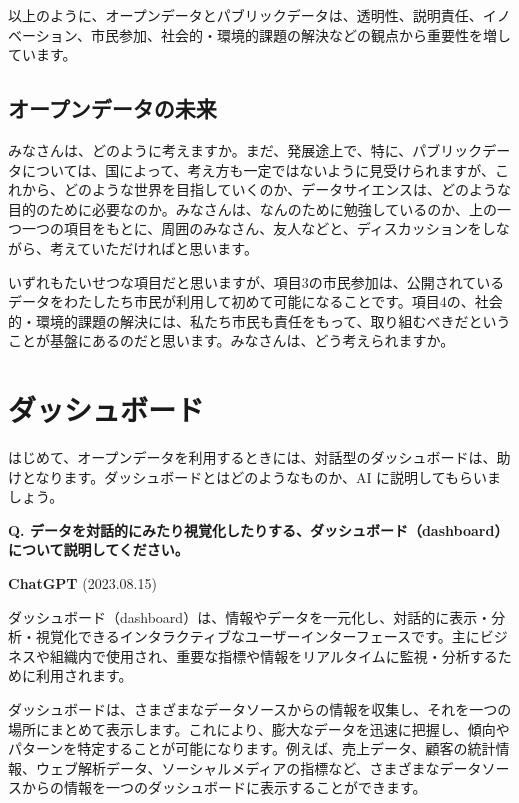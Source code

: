 \documentclass[
  xelatex, ja=standard]{bxjsbook}
\theoremstyle{definition}
\theoremstyle{definition}
\theoremstyle{definition}
\theoremstyle{definition}
\theoremstyle{remark}
\begin{document}
以上のように、オープンデータとパブリックデータは、透明性、説明責任、イノベーション、市民参加、社会的・環境的課題の解決などの観点から重要性を増しています。

\hypertarget{ux30aaux30fcux30d7ux30f3ux30c7ux30fcux30bfux306eux672aux6765}{%
\subsection{オープンデータの未来}\label{ux30aaux30fcux30d7ux30f3ux30c7ux30fcux30bfux306eux672aux6765}}

みなさんは、どのように考えますか。まだ、発展途上で、特に、パブリックデータについては、国によって、考え方も一定ではないように見受けられますが、これから、どのような世界を目指していくのか、データサイエンスは、どのような目的のために必要なのか。みなさんは、なんのために勉強しているのか、上の一つ一つの項目をもとに、周囲のみなさん、友人などと、ディスカッションをしながら、考えていただければと思います。

いずれもたいせつな項目だと思いますが、項目3の市民参加は、公開されているデータをわたしたち市民が利用して初めて可能になることです。項目4の、社会的・環境的課題の解決には、私たち市民も責任をもって、取り組むべきだということが基盤にあるのだと思います。みなさんは、どう考えられますか。

\hypertarget{ux30c0ux30c3ux30b7ux30e5ux30dcux30fcux30c9}{%
\section{ダッシュボード}\label{ux30c0ux30c3ux30b7ux30e5ux30dcux30fcux30c9}}

はじめて、オープンデータを利用するときには、対話型のダッシュボードは、助けとなります。ダッシュボードとはどのようなものか、AI に説明してもらいましょう。

\textbf{Q. データを対話的にみたり視覚化したりする、ダッシュボード（dashboard）について説明してください。}

\textbf{ChatGPT} (2023.08.15)

ダッシュボード（dashboard）は、情報やデータを一元化し、対話的に表示・分析・視覚化できるインタラクティブなユーザーインターフェースです。主にビジネスや組織内で使用され、重要な指標や情報をリアルタイムに監視・分析するために利用されます。

ダッシュボードは、さまざまなデータソースからの情報を収集し、それを一つの場所にまとめて表示します。これにより、膨大なデータを迅速に把握し、傾向やパターンを特定することが可能になります。例えば、売上データ、顧客の統計情報、ウェブ解析データ、ソーシャルメディアの指標など、さまざまなデータソースからの情報を一つのダッシュボードに表示することができます。
\end{document}
